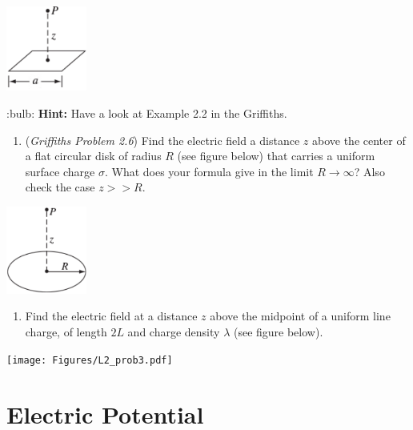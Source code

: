 \documentclass[
  letterpaper,
  DIV=11,
  numbers=noendperiod]{scrreprt}
\providecommand{\tightlist}{%
  \setlength{\itemsep}{0pt}\setlength{\parskip}{0pt}}\usepackage{longtable,booktabs,array}
\begin{document}
\includegraphics[width=1.04167in,height=\textheight]{Figures/L1_prob3.png}

:bulb: \textbf{Hint:} Have a look at Example 2.2 in the Griffiths.

\begin{enumerate}
\def\labelenumi{\arabic{enumi})}
\setcounter{enumi}{3}
\tightlist
\item
  (\emph{Griffiths Problem 2.6}) Find the electric field a distance
  \(z\) above the center of a flat circular disk of radius \(R\) (see
  figure below) that carries a uniform surface charge \(\sigma\). What
  does your formula give in the limit \(R \rightarrow \infty\)? Also
  check the case \(z >> R\).
\end{enumerate}

\includegraphics[width=1.04167in,height=\textheight]{Figures/L1_prob4.png}

\begin{enumerate}
\def\labelenumi{\arabic{enumi})}
\setcounter{enumi}{4}
\tightlist
\item
  Find the electric field at a distance \(z\) above the midpoint of a
  uniform line charge, of length \(2L\) and charge density \(\lambda\)
  (see figure below).
\end{enumerate}

\texttt{[image: Figures/L2\_prob3.pdf]}


\chapter{Electric Potential}\label{electric-potential}

\newcommand{\l}{\mathrm{\mathbf{l}}}
\newcommand{\E}{\mathrm{\mathbf{E}}}
\newcommand{\F}{\mathrm{\mathbf{F}}}
\newcommand{\r}{\mathrm{\mathbf{r}}}
\newcommand{\B}{\mathrm{\mathbf{B}}}
\newcommand{\A}{\mathrm{\mathbf{A}}}
\newcommand{\x}{\mathrm{\mathbf{x}}}
\newcommand{\y}{\mathrm{\mathbf{y}}}
\newcommand{\z}{\mathrm{\mathbf{z}}}
\newcommand{\v}{\mathrm{\mathbf{v}}}
\newcommand{\p}{\mathrm{\mathbf{p}}}
\newcommand{\d}{\mathrm{\mathbf{d}}}
\end{document}

